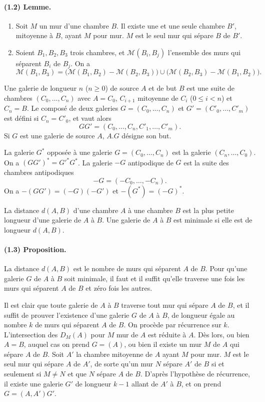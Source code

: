 \documentclass[10pt]{article}
\newcommand{\mcM}{\mathcal M}
\begin{document}
\paragraph{(1.2) Lemme.} \begin{enumerate}[label=(\roman*)]
\item Soit $M$ un mur d'une chambre $B$. Il existe une et une seule chambre $B'$, mitoyenne à $B$, ayant $M$ pour mur. $M$ est le seul mur qui sépare $B$ de $B'$.
\item Soient $B_1,B_2,B_3$ trois chambres, et $\mcM(B_i,B_j)$ l'ensemble des murs qui séparent $B_i$ de $B_j$. On a
\[
\mcM(B_1,B_3)=\bigl(\mcM(B_1,B_2)-\mcM(B_2,B_3)\bigr)\cup
\bigl(\mcM(B_2,B_3)-\mcM(B_1,B_2)\bigr).
\]
\end{enumerate}

Une galerie de longueur $n$ ($n\ge0$) de source $A$ et de but $B$ est une suite de chambres $(C_0,\ldots,C_n)$ avec $A=C_0$, $C_{i+1}$ mitoyenne de $C_i$ ($0\le i<n$) et $C_n=B$. Le composé de deux galeries $G=(C_0,\ldots,C_n)$ et $G'=(C'_0,\ldots,C'_m)$ est défini si $C_n=C'_0$, et vaut alors
\[
GG'=(C_0,\ldots,C_n,C'_1,\ldots,C'_m).
\]
Si $G$ est une galerie de source $A$, $A.G$ désigne son but.

La galerie $G^*$ opposée à une galerie $G=(C_0,\ldots,C_n)$ est la galerie $(C_n,\ldots,C_0)$. On a $(GG')^*=G'^*G^*$. La galerie $-G$ antipodique de $G$ est la suite des chambres antipodiques
\[
-G=(-C_0,\ldots,-C_n).
\]
On a $-(GG')=(-G)(-G')$ et $-(G^*)=(-G)^*$.

La distance $d(A,B)$ d'une chambre $A$ à une chambre $B$ est la plus petite longueur d'une galerie de $A$ à $B$. Une galerie de $A$ à $B$ est minimale si elle est de longueur $d(A,B)$.

\paragraph{(1.3) Proposition.} La distance $d(A,B)$ est le nombre de murs qui séparent $A$ de $B$. Pour qu'une galerie $G$ de $A$ à $B$ soit minimale, il faut et il suffit qu'elle traverse une fois les murs qui séparent $A$ de $B$ et zéro fois les autres.

Il est clair que toute galerie de $A$ à $B$ traverse tout mur qui sépare $A$ de $B$, et il suffit de prouver l'existence d'une galerie $G$ de $A$ à $B$, de longueur égale au nombre $k$ de murs qui séparent $A$ de $B$. On procède par récurrence sur $k$. L'intersection des $D_M(A)$ pour $M$ mur de $A$ est réduite à $A$. Dès lors, ou bien $A=B$, auquel cas on prend $G=(A)$, ou bien il existe un mur $M$ de $A$ qui sépare $A$ de $B$. Soit $A'$ la chambre mitoyenne de $A$ ayant $M$ pour mur. $M$ est le seul mur qui sépare $A$ de $A'$, de sorte qu'un mur $N$ sépare $A'$ de $B$ si et seulement si $M\ne N$ et que $N$ sépare $A$ de $B$. D'après l'hypothèse de récurrence, il existe une galerie $G'$ de longueur $k-1$ allant de $A'$ à $B$, et on prend $G=(A,A')G'$.
\end{document}
